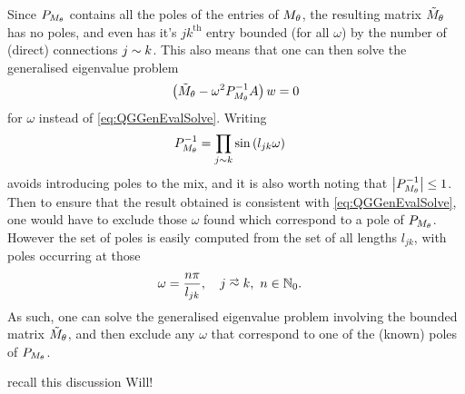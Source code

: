Since $P_{M_\theta}$ contains all the poles of the entries of $M_\theta$, the resulting matrix $\tilde{M}_\theta$ has no poles, and even has it's $jk^{\mathrm{th}}$ entry bounded (for all $\omega$) by the number of (direct) connections $j\sim k$.
This also means that one can then solve the generalised eigenvalue problem
\begin{align*}
	\left(  \tilde{M}_\theta - \omega^2 P_{M_\theta}^{-1} A \right)w = 0
\end{align*}
for $\omega$ instead of \eqref{eq:QGGenEvalSolve}.
Writing
\begin{align*}
	P_{M_\theta}^{-1} &= \prod_{j\sim k}\sin\left( l_{jk}\omega \right)
\end{align*}
avoids introducing poles to the mix, and it is also worth noting that $\left\lvert P_{M_\theta}^{-1} \right\rvert\leq 1$.
Then to ensure that the result obtained is consistent with \eqref{eq:QGGenEvalSolve}, one would have to exclude those $\omega$ found which correspond to a pole of $P_{M_\theta}$.
However the set of poles is easily computed from the set of all lengths $l_{jk}$, with poles occurring at those
\begin{align*}
	\omega &= \frac{n\pi}{l_{jk}}, \quad j\conLeft k, \ n\in\naturals_{0}.
\end{align*}
As such, one can solve the generalised eigenvalue problem involving the bounded matrix $\tilde{M}_\theta$, and then exclude any $\omega$ that correspond to one of the (known) poles of $P_{M_\theta}$.

recall this discussion Will!